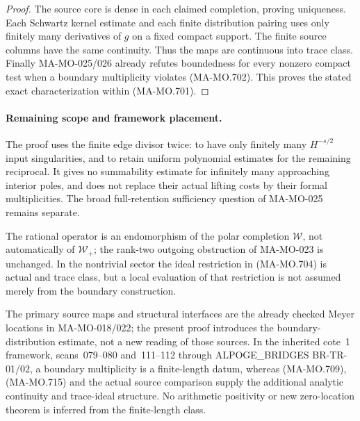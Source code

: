 \begin{proof}
The source core is dense in each claimed
completion, proving uniqueness. Each
Schwartz kernel estimate and each finite
distribution pairing uses only finitely
many derivatives of \(g\) on a fixed
compact support. The finite source columns
have the same continuity. Thus the maps
are continuous into trace class.
Finally MA-MO-025/026 already refutes
boundedness for every nonzero compact
test when a boundary multiplicity violates
(MA-MO.702). This proves the stated exact
characterization within (MA-MO.701).
\end{proof}

\paragraph{Remaining scope and framework placement.}
The proof uses the finite edge divisor twice:
to have only finitely many \(H^{-s/2}\) input
singularities, and to retain uniform polynomial
estimates for the remaining reciprocal.
It gives no summability estimate for infinitely
many approaching interior poles, and does not
replace their actual lifting costs by their
formal multiplicities. The broad full-retention
sufficiency question of MA-MO-025 remains
separate.

The rational operator is an endomorphism of
the polar completion \(\mathcal W\), not
automatically of \(\mathcal W_+\); the
rank-two outgoing obstruction of MA-MO-023
is unchanged. In the nontrivial sector the
ideal restriction in (MA-MO.704) is actual
and trace class, but a local evaluation of
that restriction is not assumed merely
from the boundary construction.

The primary source maps and structural
interfaces are the already checked Meyer
locations in MA-MO-018/022; the present
proof introduces the boundary-distribution
estimate, not a new reading of those
sources. In the inherited cote~1 framework,
scans~079--080 and~111--112 through
ALPOGE\_BRIDGES BR-TR-01/02, a boundary
multiplicity is a finite-length datum,
whereas (MA-MO.709), (MA-MO.715) and
the actual source comparison supply the
additional analytic continuity and
trace-ideal structure. No arithmetic
positivity or new zero-location theorem
is inferred from the finite-length class.
